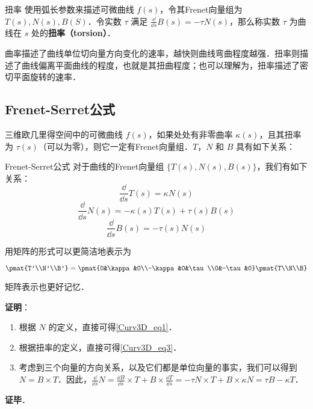 \begin{definition}{扭率}
使用弧长参数来描述可微曲线 $f(s)$，令其Frenet向量组为 $T(s), N(s), B(S)$．令实数 $\tau$ 满足 $\frac{\dd}{\dd s}B(s)=-\tau N(s)$，那么称实数 $\tau$ 为曲线在 $s$ 处的\textbf{扭率（torsion）}．
\end{definition}

曲率描述了曲线单位切向量方向变化的速率，越快则曲线弯曲程度越强．扭率则描述了曲线偏离平面曲线的程度，也就是其扭曲程度；也可以理解为，扭率描述了密切平面旋转的速率．

\subsection{Frenet-Serret公式}

三维欧几里得空间中的可微曲线 $f(s)$，如果处处有非零曲率 $\kappa(s)$，且其扭率为 $\tau(s)$（可以为零），则它一定有Frenet向量组．$T$，$N$ 和 $B$ 具有如下关系：

\begin{theorem}{Frenet-Serret公式}
对于曲线的Frenet向量组 $\{T(s), N(s), B(s)\}$，我们有如下关系：
\begin{equation}\label{Curv3D_eq1}
\frac{\dd}{\dd s}T(s)=\kappa N(s)
\end{equation}
\begin{equation}\label{Curv3D_eq2}
\frac{\dd}{\dd s}N(s)=-\kappa(s) T(s)+\tau(s) B(s)
\end{equation}
\begin{equation}\label{Curv3D_eq3}
\frac{\dd}{\dd s}B(s)=-\tau(s) N(s)
\end{equation}

用矩阵的形式可以更简洁地表示为

\begin{equation}
\pmat{T'\\N'\\B'}=\pmat{0&\kappa&0\\-\kappa&0&\tau\\0&-\tau&0}\pmat{T\\N\\B}
\end{equation}

矩阵表示也更好记忆．
\end{theorem}

\textbf{证明}：

\begin{enumerate}
\item 根据 $N$ 的定义，直接可得\autoref{Curv3D_eq1}．
\item 根据扭率的定义，直接可得\autoref{Curv3D_eq3}．
\item 考虑到三个向量的方向关系，以及它们都是单位向量的事实，我们可以得到 $N=B\times T$．因此，$\frac{\dd}{\dd s}N=\frac{\dd B}{\dd s}\times T+B\times\frac{\dd T}{\dd s}=-\tau N\times T+B\times\kappa N=\tau B-\kappa T$．
\end{enumerate}

\textbf{证毕}．





